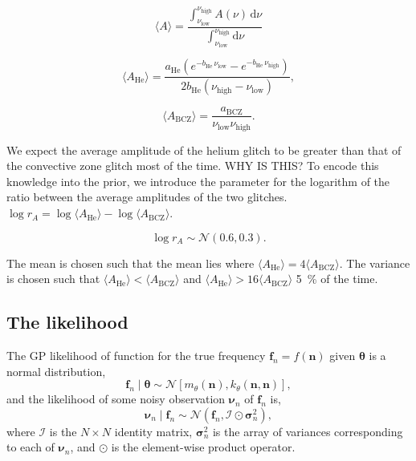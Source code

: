 \documentclass[linenumbers,modern]{aastex631}
\newcommand{\helium}{\mathrm{He}}
\newcommand{\bcz}{\mathrm{BCZ}}
\newcommand{\dd}{\mathrm{d}}
\begin{document}
\begin{equation}
    \langle A \rangle = \frac{
        \int_{\nu_\mathrm{low}}^{\nu_\mathrm{high}} A(\nu) \, \dd \nu
    }{
        \int_{\nu_\mathrm{low}}^{\nu_\mathrm{high}} \dd \nu
    }
\end{equation}

\begin{equation}
    \langle A_\helium \rangle = 
    \frac{
        a_\helium \left(
            e^{- b_\helium \, \nu_\mathrm{low}}
            - e^{- b_\helium \, \nu_\mathrm{high}}
        \right)
    }{2 b_\helium (\nu_\mathrm{high} - \nu_\mathrm{low})},
\end{equation}

\begin{equation}
    \langle A_\bcz \rangle = \frac{a_\bcz}{\nu_\mathrm{low} \nu_\mathrm{high}}.
\end{equation}

We expect the average amplitude of the helium glitch to be greater than that of
the convective zone glitch most of the time. WHY IS THIS? To encode this
knowledge into the prior, we introduce the parameter for the logarithm of the
ratio between the average amplitudes of the two glitches.
\(\log r_A = \log \langle A_\helium \rangle - \log \langle A_\bcz \rangle\).

\begin{equation}
    \log r_A \sim \mathcal{N}(0.6, 0.3).
\end{equation}

The mean is chosen such that the mean lies where
\(\langle A_\helium \rangle = 4 \langle A_\bcz \rangle\). The variance is
chosen such that \(\langle A_\helium \rangle < \langle A_\bcz \rangle\) and
\(\langle A_\helium \rangle > 16 \langle A_\bcz \rangle\) \SI{5}{\percent} of
the time.

\subsection{The likelihood}

The GP likelihood of function for the true frequency \(\bm f_n = f(\bm n)\)
given \(\bm\theta\) is a normal distribution,
%
\begin{equation}
    \bm f_n \mid \bm\theta \sim
    \mathcal{N}\left[m_\theta(\bm n), k_\theta(\bm n, \bm n)\right],
\end{equation}
%
and the likelihood of some noisy observation \(\bm\nu_n\) of \(\bm f_n\) is,
%
\begin{equation}
    \bm\nu_n \mid \bm f_n \sim
    \mathcal{N}(\bm f_n, \bm{\mathcal{I}} \odot \bm\sigma_n^2),
\end{equation}
%
where \(\bm{\mathcal{I}}\) is the \(N \times N\) identity matrix,
\(\bm\sigma_n^2\) is the array of variances corresponding to each of
\(\bm\nu_n\), and \(\odot\) is the element-wise product operator.
\end{document}
